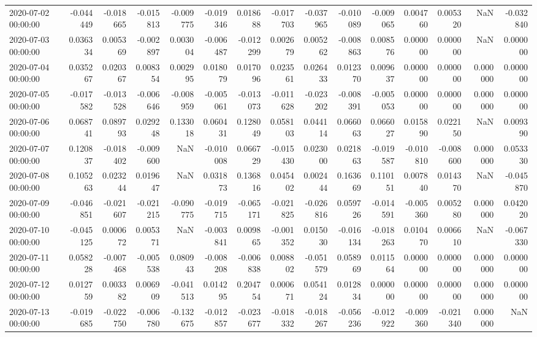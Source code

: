 \begin{tabular}{lrrrrrrrrrrrrrr}
2020-07-02 00:00:00 & -0.044449 & -0.018665 & -0.015813 & -0.009775 & -0.019346 & 0.018688 & -0.017703 & -0.037965 & -0.010089 & -0.009065 & 0.004760 & 0.005320 & NaN & -0.032840 \\
2020-07-03 00:00:00 & 0.036334 & 0.005369 & -0.002897 & 0.003004 & -0.006487 & -0.012299 & 0.002679 & 0.005262 & -0.008863 & 0.008576 & 0.000000 & 0.000000 & NaN & 0.000000 \\
2020-07-04 00:00:00 & 0.035267 & 0.020367 & 0.008354 & 0.002995 & 0.018079 & 0.017096 & 0.023561 & 0.026433 & 0.012370 & 0.009637 & 0.000000 & 0.000000 & 0.000000 & 0.000000 \\
2020-07-05 00:00:00 & -0.017582 & -0.013528 & -0.006646 & -0.008959 & -0.005061 & -0.013073 & -0.011628 & -0.023202 & -0.008391 & -0.005053 & 0.000000 & 0.000000 & 0.000000 & 0.000000 \\
2020-07-06 00:00:00 & 0.068741 & 0.089793 & 0.029248 & 0.133018 & 0.060431 & 0.128049 & 0.058103 & 0.044114 & 0.066063 & 0.066027 & 0.015890 & 0.022150 & NaN & 0.009390 \\
2020-07-07 00:00:00 & 0.120837 & -0.018402 & -0.009600 & NaN & -0.010008 & 0.066729 & -0.015430 & 0.023000 & 0.021863 & -0.019587 & -0.010810 & -0.008600 & 0.000000 & 0.053330 \\
2020-07-08 00:00:00 & 0.105263 & 0.023244 & 0.019647 & NaN & 0.031873 & 0.136816 & 0.045402 & 0.002444 & 0.163669 & 0.110151 & 0.007840 & 0.014370 & NaN & -0.045870 \\
2020-07-09 00:00:00 & -0.046851 & -0.021607 & -0.021215 & -0.090775 & -0.019715 & -0.065171 & -0.021825 & -0.026816 & 0.059726 & -0.014591 & -0.005360 & 0.005280 & 0.000000 & 0.042020 \\
2020-07-10 00:00:00 & -0.045125 & 0.000672 & 0.005371 & NaN & -0.003841 & 0.009865 & -0.001352 & 0.015030 & -0.016134 & -0.018263 & 0.010470 & 0.006610 & NaN & -0.067330 \\
2020-07-11 00:00:00 & 0.058228 & -0.007468 & -0.005538 & 0.080943 & -0.008208 & -0.006838 & 0.008802 & -0.051579 & 0.058969 & 0.011564 & 0.000000 & 0.000000 & 0.000000 & 0.000000 \\
2020-07-12 00:00:00 & 0.012759 & 0.003382 & 0.006909 & -0.041513 & 0.014295 & 0.204754 & 0.000671 & 0.054124 & 0.012834 & 0.000000 & 0.000000 & 0.000000 & 0.000000 & 0.000000 \\
2020-07-13 00:00:00 & -0.019685 & -0.022750 & -0.006780 & -0.132675 & -0.012857 & -0.023677 & -0.018332 & -0.018267 & -0.056236 & -0.012922 & -0.009360 & -0.021340 & 0.000000 & NaN \\

\end{tabular}
